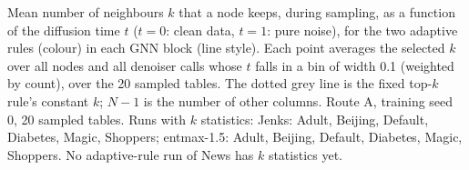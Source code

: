 Mean number of neighbours $k$ that a node keeps, during sampling, as a function of the diffusion time $t$ ($t=0$: clean data, $t=1$: pure noise), for the two adaptive rules (colour) in each GNN block (line style). Each point averages the selected $k$ over all nodes and all denoiser calls whose $t$ falls in a bin of width 0.1 (weighted by count), over the 20 sampled tables. The dotted grey line is the fixed top-$k$ rule's constant $k$; $N-1$ is the number of other columns. Route A, training seed 0, 20 sampled tables. Runs with $k$ statistics: Jenks: Adult, Beijing, Default, Diabetes, Magic, Shoppers; entmax-1.5: Adult, Beijing, Default, Diabetes, Magic, Shoppers. No adaptive-rule run of News has $k$ statistics yet.
